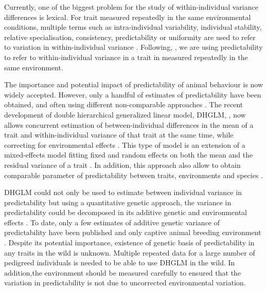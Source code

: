 \documentclass[a4paper,12pt,twoside]{article}
\begin{document}
	Currently, one of the biggest problem for the study of within-individual variance differences is lexical. 
	For trait measured repeatedly in the same environmental conditions, multiple terms such as intra-individual variability, individual stability, relative specialisation, consistency, predictability or uniformity are used to refer to variation in within-individual variance \citep{stamps_unpredictable_2012,cleasby_quantifying_2015,sae-lim_genetic_2015}.
	Following, \cite{cleasby_quantifying_2015}, we are using predictability to refer to within-individual variance in a trait in measured repeatedly in the same environment.
	
	The importance and potential impact of predictability of animal behaviour is now widely accepted\citep{reale_personality_2010, stamps_unpredictable_2012}.
	However, only a handful of estimates of predictability have been obtained, and often using different non-comparable approaches \citep{cleasby_quantifying_2015}.
	The recent development of double hierarchical generalized linear model, DHGLM, \citep{lee_double_2006}, now allows concurrent estimation of between-individual differences in the mean of a trait and within-individual variance of that trait at the same time, while correcting for environmental effects \citep{cleasby_quantifying_2015}.
	This type of model is an extension of a mixed-effects model fitting fixed and random effects on both the mean and the residual variance of a trait \citep{lee_double_2006,cleasby_quantifying_2015}.
	In addition, this approach also allow to obtain comparable parameter of predictability between traits, environments and species \citep{hill_genetic_2010,cleasby_quantifying_2015}.
	
	DHGLM could not only be used to estimate between individual variance in predictability but using a quantitative genetic approach, the variance in predictability could be decomposed in its additive genetic and environmental effects \citep{ronnegard_genetic_2010, sae-lim_genetic_2015}.
	To date, only a few estimates of additive genetic variance of predictability have been published and only captive animal breeding environment \citep{mulder_heritable_2015,hill_genetic_2010,sae-lim_genetic_2015}.
	Despite its potential importance, existence of genetic basis of predictability in any traits in the wild is unknown.
	Multiple repeated data for a large number of pedigreed individuals is needed to be able to use DHGLM in the wild. 
	In addition,the environment should be measured carefully to ensured that the variation in predictability is not due to uncorrected environmental variation.
	
\end{document}
